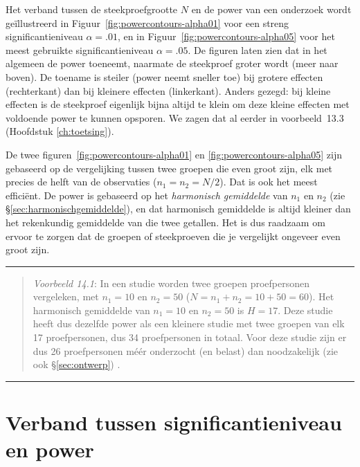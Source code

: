 \documentclass[
]{book}
\begin{document}
Het verband tussen de steekproefgrootte \(N\) en de power van een
onderzoek wordt geïllustreerd in
Figuur~\ref{fig:powercontours-alpha01} voor een streng
significantieniveau \(\alpha=.01\), en in
Figuur~\ref{fig:powercontours-alpha05} voor het meest gebruikte
significantieniveau \(\alpha=.05\). De figuren laten zien dat in het
algemeen de power toeneemt, naarmate de steekproef groter wordt (meer
naar boven). De toename is steiler (power neemt sneller toe) bij grotere
effecten (rechterkant) dan bij kleinere effecten (linkerkant). Anders gezegd: bij
kleine effecten is de steekproef eigenlijk bijna altijd te klein om deze
kleine effecten met voldoende power te kunnen opsporen. We zagen dat al
eerder in voorbeeld~13.3 (Hoofdstuk \ref{ch:toetsing}).

De twee figuren~\ref{fig:powercontours-alpha01} en
\ref{fig:powercontours-alpha05} zijn gebaseerd op de vergelijking tussen twee groepen die even groot zijn, elk met precies de helft van de observaties (\(n_1=n_2=N/2\)). Dat is ook het meest efficiënt.
De power is gebaseerd op het \emph{harmonisch gemiddelde} van \(n_1\) en \(n_2\) (zie §\ref{sec:harmonischgemiddelde}), en dat harmonisch gemiddelde is altijd kleiner dan het rekenkundig gemiddelde van die twee getallen. Het is dus raadzaam om ervoor te zorgen dat de groepen of steekproeven die je vergelijkt ongeveer even groot zijn.

\begin{center}\rule{0.5\linewidth}{0.5pt}\end{center}

\begin{quote}
\emph{Voorbeeld 14.1}: In een studie worden twee groepen proefpersonen vergeleken, met \(n_1=10\) en \(n_2=50\) (\(N=n_1+n_2=10+50=60\)). Het harmonisch gemiddelde van \(n_1=10\) en \(n_2=50\) is \(H=17\). Deze studie heeft dus dezelfde power als een kleinere studie met twee groepen van elk 17 proefpersonen, dus 34 proefpersonen in totaal. Voor deze studie zijn er dus 26 proefpersonen méér onderzocht (en belast) dan noodzakelijk (zie ook §\ref{sec:ontwerp}) \citep[p.295]{ACA11}.
\end{quote}

\begin{center}\rule{0.5\linewidth}{0.5pt}\end{center}

\hypertarget{sec:significantieniveau-power}{%
\section{Verband tussen significantieniveau en power}\label{sec:significantieniveau-power}}
\end{document}
